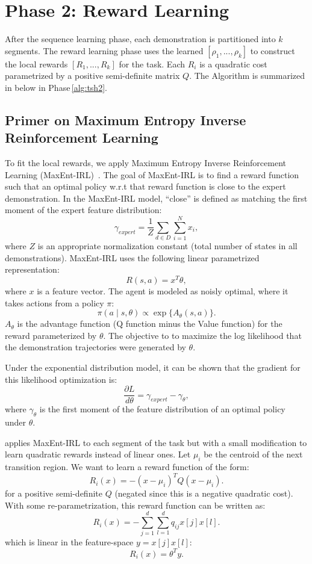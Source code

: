 
\section{Phase 2: Reward Learning}\label{sec:reward}
After the sequence learning phase, each demonstration is partitioned into $k$ segments.
The reward learning phase uses the learned $[\rho_1,...,\rho_k]$ to construct the local rewards $[R_1,...,R_k]$ for the task.
Each $R_i$ is a quadratic cost parametrized by a positive semi-definite matrix $Q$.
The Algorithm is summarized in below in Phase\,\ref{alg:tsh2}.


\subsection{Primer on Maximum Entropy Inverse Reinforcement Learning}
To fit the local rewards, we apply Maximum Entropy Inverse Reinforcement Learning (MaxEnt-IRL)~\cite{DBLP:conf/aaai/ZiebartMBD08}. 
The goal of MaxEnt-IRL is to find a reward function such that an optimal policy w.r.t that reward function is close to the
expert demonstration.
In the MaxEnt-IRL model, ``close'' is defined as matching the first moment of the expert feature distribution:
\[
\gamma_{expert} = \frac{1}{Z} \sum_{d \in D} \sum_{i=1}^N x_i,
\]
where $Z$ is an appropriate normalization constant (total number of states in all demonstrations).
MaxEnt-IRL uses the following linear parametrized representation:
\[
R(s,a) = x^T \theta,
\]
where $x$ is a feature vector.
The agent is modeled as noisly optimal, where it takes actions from a policy $\pi$:
\[
\pi(a \mid s, \theta) \propto \exp\{A_\theta(s,a)\}.
\]
$A_\theta$ is the advantage function (Q function minus the Value function) for the reward parameterized by $\theta$.
The objective to to maximize the log likelihood that the demonstration trajectories were generated by  $\theta$.

Under the exponential distribution model, it can be shown that the gradient for this likelihood optimization is:
\[
\frac{\partial L}{d \theta} = \gamma_{expert} - \gamma_{\theta},
\]
where $\gamma_{\theta}$ is the first moment of the feature distribution of an optimal policy under $\theta$.

\hirl applies MaxEnt-IRL to each segment of the task but with a small modification to learn quadratic rewards instead of linear ones. 
Let $\mu_i$ be the centroid of the next transition region.
We want to learn a reward function of the form:
\[
R_i(x) = -(x-\mu_i)^T Q (x-\mu_i).
\]
for a positive semi-definite $Q$ (negated since this is a negative quadratic cost).
With some re-parametrization, this reward function can be written as:
\[
R_i(x) = -\sum_{j=1}^d \sum_{l=1}^d q_{ij} x[j] x[l].
\]
which is linear in the feature-space $y = x[j] x[l]$:
\[
R_i(x) = \theta^T y.
\]

